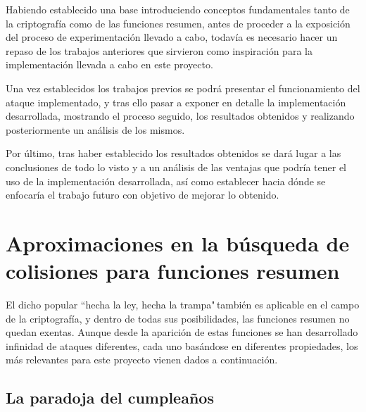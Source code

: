 \documentclass[12pt,spanish,listoffigures,listoftables]{tfgetsinf}
\begin{document}
Habiendo establecido una base introduciendo conceptos fundamentales tanto de la criptografía como de las funciones resumen, antes de proceder a la exposición del proceso de experimentación llevado a cabo, todavía es necesario hacer un repaso de los trabajos anteriores que sirvieron como inspiración para la implementación llevada a cabo en este proyecto.

Una vez establecidos los trabajos previos se podrá presentar el funcionamiento del ataque implementado, y tras ello pasar a exponer en detalle la implementación desarrollada, mostrando el proceso seguido, los resultados obtenidos y realizando posteriormente un análisis de los mismos.

Por último, tras haber establecido los resultados obtenidos se dará lugar a las conclusiones de todo lo visto y a un análisis de las ventajas que podría tener el uso de la implementación desarrollada, así como establecer hacia dónde se enfocaría el trabajo futuro con objetivo de mejorar lo obtenido.




\chapter{Aproximaciones en la búsqueda de colisiones para funciones resumen}

El dicho popular ``hecha la ley, hecha la trampa"\,también es aplicable en el campo de la criptografía, y dentro de todas sus posibilidades, las funciones resumen no quedan exentas. Aunque desde la aparición de estas funciones se han desarrollado infinidad de ataques diferentes, cada uno basándose en diferentes propiedades, los más relevantes para este proyecto vienen dados a continuación.

\section{La paradoja del cumpleaños}
\end{document}
